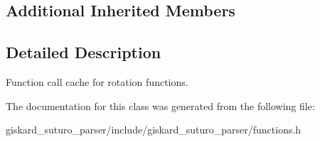 \subsection*{Additional Inherited Members}


\subsection{Detailed Description}
Function call cache for rotation functions. 

The documentation for this class was generated from the following file\-:\begin{DoxyCompactItemize}
\item 
giskard\-\_\-suturo\-\_\-parser/include/giskard\-\_\-suturo\-\_\-parser/functions.\-h\end{DoxyCompactItemize}
